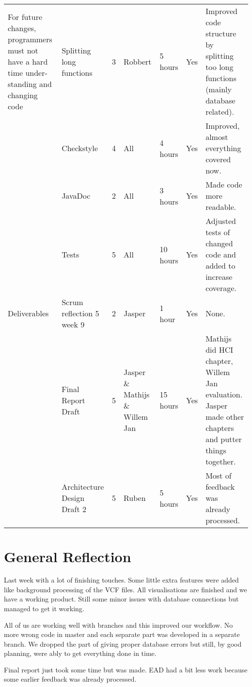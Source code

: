 \documentclass[a4paper]{report}
\begin{document}
\begin{landscape}
\begin{longtable}{p{3cm}|p{5cm}|l|l|l|l|p{7cm}}
For future changes, programmers must not have a hard time under- standing and changing code
& Splitting long functions & 3 & Robbert & 5 hours & Yes & Improved code structure by splitting too long functions (mainly database related). \\
& Checkstyle & 4 & All & 4 hours & Yes & Improved, almost everything covered now. \\
& JavaDoc & 2 & All & 3 hours & Yes & Made code more readable. \\
& Tests & 5 & All & 10 hours & Yes & Adjusted tests of changed code and added to increase coverage. \\
\hline

Deliverables
& Scrum reflection 5 week 9 & 2 & Jasper & 1 hour & Yes & None.\\
& Final Report Draft & 5 & Jasper \& Mathijs \& Willem Jan & 15 hours & Yes & Mathijs did HCI chapter, Willem Jan evaluation. Jasper made other chapters and putter things together. \\
& Architecture Design Draft 2 & 5 & Ruben & 5 hours & Yes & Most of feedback was already processed. \\
\hline
\end{longtable}
\end{landscape}

\section*{General Reflection}
Last week with a lot of finishing touches. Some little extra features were added like background processing of the VCF files. All visualisations are finished and we have a working product. Still some minor issues with database connections but managed to get it working.

All of us are working well with branches and this improved our workflow. No more wrong code in master and each separate part was developed in a separate branch. We dropped the part of giving proper database errors but still, by good planning, were ably to get everything done in time.

Final report just took some time but was made. EAD had a bit less work because some earlier feedback was already processed. \\
\end{document}
